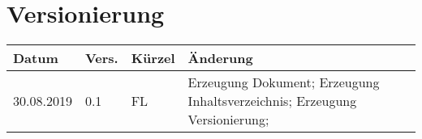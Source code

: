 \newpage
\tableofcontents

\section*{Versionierung}
\begin{tabular}{|p{2cm}|p{1cm}|p{1.5cm}|p{10.5cm}|}\hline
Datum & Vers. & Kürzel & Änderung \\ \hline
30.08.2019 & 0.1 & FL & Erzeugung Dokument; Erzeugung Inhaltsverzeichnis; Erzeugung Versionierung; \\ \hline
\end{tabular}
\listoffigures